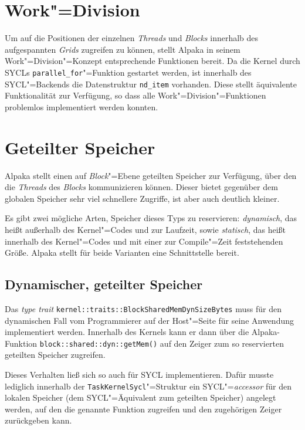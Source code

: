 \section{Work"=Division}
\label{implementierung:workDiv}

Um auf die Positionen der einzelnen \textit{Threads} und \textit{Blocks}
innerhalb des aufgespannten \textit{Grids} zugreifen zu können, stellt Alpaka
in seinem Work"=Division"=Konzept entsprechende Funktionen bereit. Da die Kernel
durch SYCLs \texttt{parallel\_for}"=Funktion gestartet werden, ist innerhalb
des SYCL"=Backends die Datenstruktur \texttt{nd\_item} vorhanden. Diese stellt
äquivalente Funktionalität zur Verfügung, so dass alle
Work"=Division"=Funktionen problemlos implementiert werden konnten.

\section{Geteilter Speicher}
\label{implementierung:shared}

Alpaka stellt einen auf \textit{Block}"=Ebene geteilten Speicher zur Verfügung,
über den die \textit{Threads} des \textit{Blocks} kommunizieren können. Dieser
bietet gegenüber dem globalen Speicher sehr viel schnellere Zugriffe, ist aber
auch deutlich kleiner. 

Es gibt zwei mögliche Arten, Speicher dieses Typs zu reservieren:
\textit{dynamisch}, das heißt außerhalb des Kernel"=Codes und zur Laufzeit,
sowie \textit{statisch}, das heißt innerhalb des Kernel"=Codes und mit einer zur
Compile"=Zeit feststehenden Größe. Alpaka stellt für beide Varianten eine
Schnittstelle bereit.

\subsection{Dynamischer, geteilter Speicher}

Das \textit{type trait} \texttt{kernel::traits::BlockSharedMemDynSizeBytes}
muss für den dynamischen Fall vom Programmierer auf der Host"=Seite für seine
Anwendung implementiert werden. Innerhalb des Kernels kann er dann über die
Alpaka-Funktion \texttt{block::shared::dyn::getMem()} auf den Zeiger zum so
reservierten geteilten Speicher zugreifen.

Dieses Verhalten ließ sich so auch für SYCL implementieren. Dafür musste
lediglich innerhalb der \texttt{TaskKernelSycl}"=Struktur ein
SYCL"=\textit{accessor} für den lokalen Speicher (dem SYCL"=Äquivalent zum
geteilten Speicher) angelegt werden, auf den die genannte Funktion zugreifen und
den zugehörigen Zeiger zurückgeben kann.

